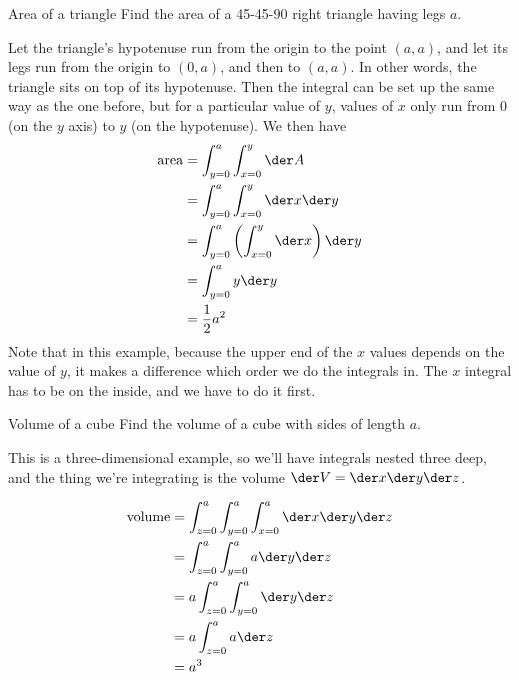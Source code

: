 \begin{eg}{Area of a triangle}
\egquestion Find the area of a 45-45-90 right triangle having legs $a$.

\eganswer Let the triangle's hypotenuse run from the origin to the point $(a,a)$,
and let its legs run from the origin to $(0,a)$, and then to $(a,a)$. In other
words, the triangle sits on top of its hypotenuse. Then the integral can be set
up the same way as the one before, but for a particular value of $y$, values of
$x$ only run from 0 (on the $y$ axis) to $y$ (on the hypotenuse). We then have
\begin{align*}
  \text{area} &= \int_{y=0}^a \int_{x=0}^y \der A \\
              &= \int_{y=0}^a \int_{x=0}^y \der x \der y \\
              &= \int_{y=0}^a \left(\int_{x=0}^y \der x\right) \der y \\
              &= \int_{y=0}^a y \der y \\
              &= \frac{1}{2}a^2
\end{align*}
Note that in this example, because the upper end of the $x$ values depends
on the value of $y$, it makes a difference which order we do the integrals
in. The $x$ integral has to be on the inside, and we have to do it first.
\end{eg}

\begin{eg}{Volume of a cube}
\egquestion Find the volume of a cube with sides of length $a$.

\eganswer This is a three-dimensional example, so we'll have integrals
nested three deep, and the thing we're integrating is the volume
$\der V = \der x \der y \der z$.

\begin{align*}
  \text{volume} &= \int_{z=0}^a \int_{y=0}^a \int_{x=0}^a \der x \der y \der z \\
              &= \int_{z=0}^a \int_{y=0}^a a \der y \der z \\
              &= a \int_{z=0}^a \int_{y=0}^a \der y \der z \\
              &= a \int_{z=0}^a a \der z \\
              &= a^3
\end{align*}
\end{eg}

